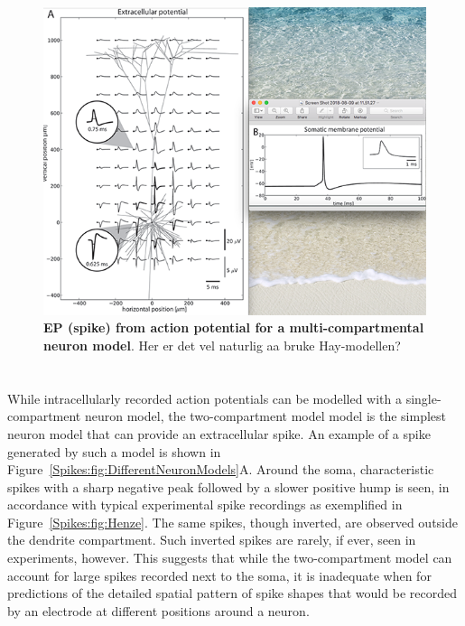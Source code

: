 \begin{figure}[!ht]
\begin{center}
\includegraphics{Figures/Spikes/Spikes-MultiCompartment-w100-r150}
\end{center}
\caption[]{\textbf{EP (spike) from action potential for a multi-compartmental neuron model}. 
Her er det vel naturlig aa bruke Hay-modellen?
}
\label{Spikes:fig:MultiCompartment}
\end{figure}

\section{}
\label{Spikes:sec:two-compartment}
While intracellularly recorded action potentials  can be modelled with a single-compartment neuron model, the two-compartment model
model is the simplest neuron model that can provide an extracellular spike. An example of a spike generated by such a model is shown in
Figure~\ref{Spikes:fig:DifferentNeuronModels}A. Around the soma, characteristic
spikes with a sharp negative peak followed by a slower positive hump is seen, in accordance with typical experimental
spike recordings as exemplified in Figure~\ref{Spikes:fig:Henze}. The same spikes, though inverted, are observed outside
the dendrite compartment. Such inverted spikes are rarely, if ever, seen in experiments, however. This suggests that while the two-compartment model can account for large spikes recorded next to the soma, it is inadequate when for 
predictions of  the detailed spatial pattern of  spike shapes that would be recorded by an electrode at different positions around a neuron.        

